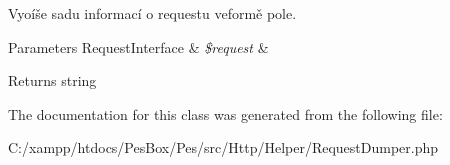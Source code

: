 Vyoíše sadu informací o requestu veformě pole. 
\begin{DoxyParams}[1]{Parameters}
Request\+Interface & {\em \$request} & \\
\hline
\end{DoxyParams}
\begin{DoxyReturn}{Returns}
string 
\end{DoxyReturn}


The documentation for this class was generated from the following file\+:\begin{DoxyCompactItemize}
\item 
C\+:/xampp/htdocs/\+Pes\+Box/\+Pes/src/\+Http/\+Helper/Request\+Dumper.\+php\end{DoxyCompactItemize}
